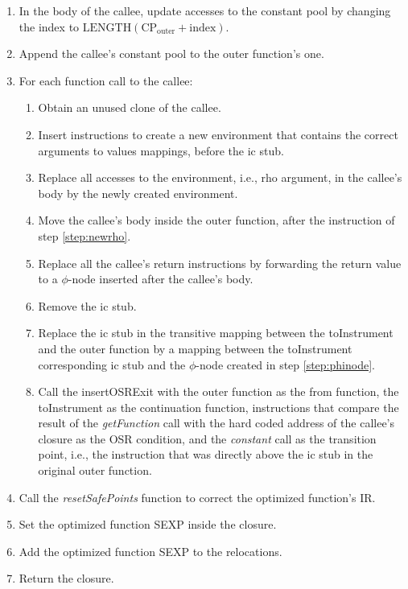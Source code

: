 \begin{enumerate}
    \item In the body of the callee, update accesses to the constant pool by changing the index to $\text{LENGTH}(\text{CP}_{\text{outer}} + \text{index})$.
    \item Append the callee's constant pool to the outer function's one.
    \item For each function call to the callee:
        \begin{enumerate}
            \item Obtain an unused clone of the callee.
            \item Insert instructions to create a new environment that contains the correct arguments to values mappings, before the ic stub.\label{step:newrho}
            \item Replace all accesses to the environment, i.e., rho argument, in the callee's body by the newly created environment.
            \item Move the callee's body inside the outer function, after the instruction of step \ref{step:newrho}.
            \item Replace all the callee's return instructions by forwarding the return value to a $\phi$-node inserted after the callee's body.\label{step:phinode}
            \item Remove the ic stub.
            \item Replace the ic stub in the transitive mapping between the toInstrument and the outer function by a mapping between the toInstrument corresponding ic stub and the $\phi$-node created in step \ref{step:phinode}.\label{step:updatemap}
            \item Call the insertOSRExit with the outer function as the from function, the toInstrument as the continuation function, instructions that compare the result of the \textit{getFunction} call with the hard coded address of the callee's closure as the OSR condition, and the \textit{constant} call as the transition point, i.e., the instruction that was directly above the ic stub in the original outer function.
        \end{enumerate}
    \item Call the \textit{resetSafePoints} function to correct the optimized function's IR.
    \item Set the optimized function SEXP inside the closure.
    \item Add the optimized function SEXP to the relocations.
    \item Return the closure.
\end{enumerate}

